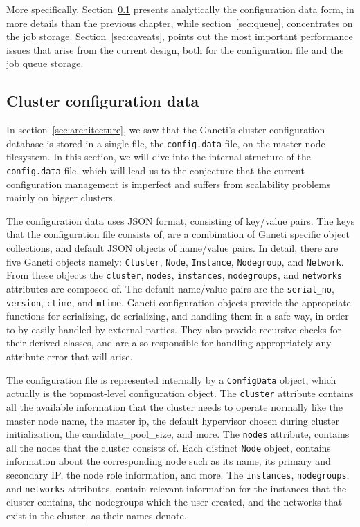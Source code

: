 More specifically, Section~\ref{sec:config} presents analytically the
configuration data form, in more details than the previous chapter, while
section~\ref{sec:queue}, concentrates on the job storage.
Section~\ref{sec:caveats}, points out the most important performance issues
that arise from the current design, both for the configuration file and the job
queue storage.

\subsection{Cluster configuration data}\label{sec:config}

In section~\ref{sec:architecture}, we saw that the Ganeti's cluster
configuration database is stored in a single file, the \texttt{config.data}
file, on the master node filesystem. In this section, we will dive into the
internal structure of the \texttt{config.data} file, which will lead us to the
conjecture that the current configuration management is imperfect and suffers
from scalability problems mainly on bigger clusters.

The configuration data uses JSON format, consisting of key/value pairs.
The keys that the configuration file consists of, are a combination of Ganeti
specific object collections, and default JSON objects of name/value pairs.
In detail, there are five Ganeti objects namely: \texttt{Cluster},
\texttt{Node}, \texttt{Instance}, \texttt{Nodegroup}, and
\texttt{Network}. From these objects the \texttt{cluster}, \texttt{nodes},
\texttt{instances}, \texttt{nodegroups}, and \texttt{networks} attributes are
composed of. The default name/value pairs are the \texttt{serial\_no},
\texttt{version}, \texttt{ctime}, and \texttt{mtime}. Ganeti configuration
objects provide the appropriate functions for serializing, de-serializing, and
handling them in a safe way, in order to by easily handled by external parties.
They also provide recursive checks for their derived classes, and are also
responsible for handling appropriately any attribute error that will arise.

The configuration file is represented internally by a \texttt{ConfigData}
object, which actually is the topmost-level configuration object.
The \texttt{cluster} attribute contains all the available information that
the cluster needs to operate normally like the master node name, the master ip,
the default hypervisor chosen during cluster initialization, the
candidate\_pool\_size, and more. The \texttt{nodes} attribute, contains all the
nodes that the cluster consists of. Each distinct \texttt{Node} object, contains
information about the corresponding node such as its name, its primary and
secondary IP, the node role information, and more. The \texttt{instances},
\texttt{nodegroups}, and \texttt{networks} attributes, contain relevant
information for the instances that the cluster contains, the nodegroups which
the user created, and the networks that exist in the cluster, as their names
denote.

